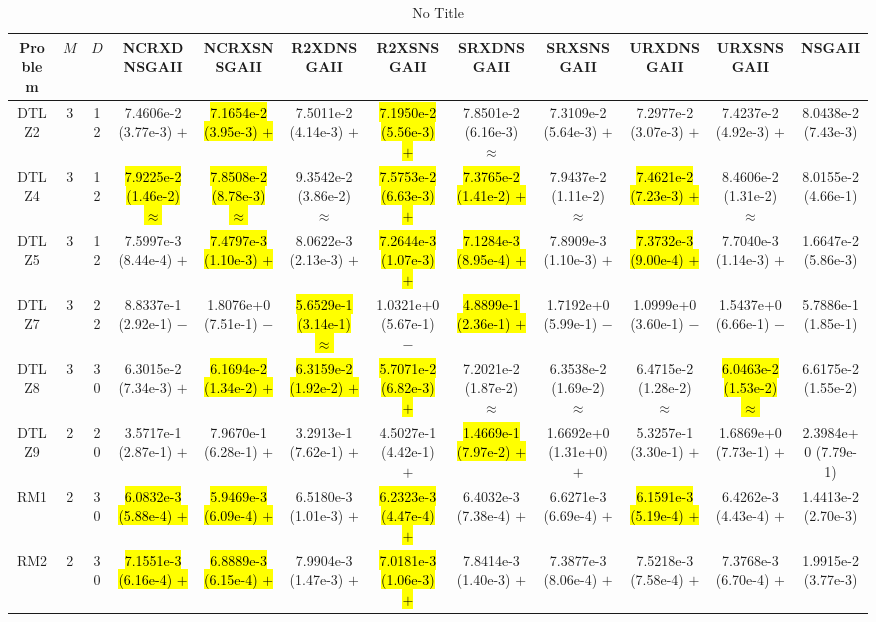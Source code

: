 \documentclass[journal]{IEEEtran}
\begin{document}
\begin{table*}[htbp]
\renewcommand{\arraystretch}{1.2}
\centering
\caption{No Title}
\begin{tabular}{cccccccccccc}
\toprule
Problem&$M$&$D$&NCRXDNSGAII&NCRXSNSGAII&R2XDNSGAII&R2XSNSGAII&SRXDNSGAII&SRXSNSGAII&URXDNSGAII&URXSNSGAII&NSGAII\\
\midrule
\multirow{1}{*}{DTLZ2}&3&12&7.4606e-2 (3.77e-3) $+$&\hl{7.1654e-2 (3.95e-3) $+$}&7.5011e-2 (4.14e-3) $+$&\hl{7.1950e-2 (5.56e-3) $+$}&7.8501e-2 (6.16e-3) $\approx$&7.3109e-2 (5.64e-3) $+$&7.2977e-2 (3.07e-3) $+$&7.4237e-2 (4.92e-3) $+$&8.0438e-2 (7.43e-3)\\
\hline
\multirow{1}{*}{DTLZ4}&3&12&\hl{7.9225e-2 (1.46e-2) $\approx$}&\hl{7.8508e-2 (8.78e-3) $\approx$}&9.3542e-2 (3.86e-2) $\approx$&\hl{7.5753e-2 (6.63e-3) $+$}&\hl{7.3765e-2 (1.41e-2) $+$}&7.9437e-2 (1.11e-2) $\approx$&\hl{7.4621e-2 (7.23e-3) $+$}&8.4606e-2 (1.31e-2) $\approx$&8.0155e-2 (4.66e-1)\\
\hline
\multirow{1}{*}{DTLZ5}&3&12&7.5997e-3 (8.44e-4) $+$&\hl{7.4797e-3 (1.10e-3) $+$}&8.0622e-3 (2.13e-3) $+$&\hl{7.2644e-3 (1.07e-3) $+$}&\hl{7.1284e-3 (8.95e-4) $+$}&7.8909e-3 (1.10e-3) $+$&\hl{7.3732e-3 (9.00e-4) $+$}&7.7040e-3 (1.14e-3) $+$&1.6647e-2 (5.86e-3)\\
\hline
\multirow{1}{*}{DTLZ7}&3&22&8.8337e-1 (2.92e-1) $-$&1.8076e+0 (7.51e-1) $-$&\hl{5.6529e-1 (3.14e-1) $\approx$}&1.0321e+0 (5.67e-1) $-$&\hl{4.8899e-1 (2.36e-1) $+$}&1.7192e+0 (5.99e-1) $-$&1.0999e+0 (3.60e-1) $-$&1.5437e+0 (6.66e-1) $-$&5.7886e-1 (1.85e-1)\\
\hline
\multirow{1}{*}{DTLZ8}&3&30&6.3015e-2 (7.34e-3) $+$&\hl{6.1694e-2 (1.34e-2) $+$}&\hl{6.3159e-2 (1.92e-2) $+$}&\hl{5.7071e-2 (6.82e-3) $+$}&7.2021e-2 (1.87e-2) $\approx$&6.3538e-2 (1.69e-2) $\approx$&6.4715e-2 (1.28e-2) $\approx$&\hl{6.0463e-2 (1.53e-2) $\approx$}&6.6175e-2 (1.55e-2)\\
\hline
\multirow{1}{*}{DTLZ9}&2&20&3.5717e-1 (2.87e-1) $+$&7.9670e-1 (6.28e-1) $+$&3.2913e-1 (7.62e-1) $+$&4.5027e-1 (4.42e-1) $+$&\hl{1.4669e-1 (7.97e-2) $+$}&1.6692e+0 (1.31e+0) $+$&5.3257e-1 (3.30e-1) $+$&1.6869e+0 (7.73e-1) $+$&2.3984e+0 (7.79e-1)\\
\hline
\multirow{1}{*}{RM1}&2&30&\hl{6.0832e-3 (5.88e-4) $+$}&\hl{5.9469e-3 (6.09e-4) $+$}&6.5180e-3 (1.01e-3) $+$&\hl{6.2323e-3 (4.47e-4) $+$}&6.4032e-3 (7.38e-4) $+$&6.6271e-3 (6.69e-4) $+$&\hl{6.1591e-3 (5.19e-4) $+$}&6.4262e-3 (4.43e-4) $+$&1.4413e-2 (2.70e-3)\\
\hline
\multirow{1}{*}{RM2}&2&30&\hl{7.1551e-3 (6.16e-4) $+$}&\hl{6.8889e-3 (6.15e-4) $+$}&7.9904e-3 (1.47e-3) $+$&\hl{7.0181e-3 (1.06e-3) $+$}&7.8414e-3 (1.40e-3) $+$&7.3877e-3 (8.06e-4) $+$&7.5218e-3 (7.58e-4) $+$&7.3768e-3 (6.70e-4) $+$&1.9915e-2 (3.77e-3)\\

\end{tabular}
\end{table*}
\end{document}
